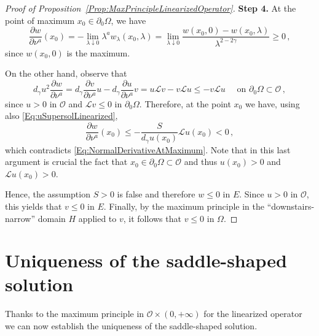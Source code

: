 \documentclass[12pt,reqno]{amsart}
\theoremstyle{definition}
\theoremstyle{remark}
\newcommand{\ocal}{\mathcal{O}}
\newcommand{\s}{\gamma}
\numberwithin{equation}{section}
\begin{document}
\begin{proof}[Proof of Proposition~\ref{Prop:MaxPrincipleLinearizedOperator}]
\textbf{Step 4.}
At the point of maximum $x_0 \in \partial_0 \Omega$, we have
\begin{equation}
\label{Eq:NormalDerivativeAtMaximum}
\dfrac{\partial w}{\partial \nu^a}(x_0) = -\lim_{\lambda \downarrow 0} \lambda^a w_\lambda (x_0,\lambda) = \lim_{\lambda \downarrow 0} \dfrac{w(x_0,0) - w(x_0, \lambda)}{\lambda^{2-2\s}} \geq 0\,,
\end{equation}
since $w(x_0,0)$ is the maximum.

On the other hand, observe that
$$
d_\s u^2 \dfrac{\partial w}{\partial \nu^a} = d_\s  \dfrac{\partial v}{\partial \nu^a} u  - d_\s  \dfrac{\partial u}{\partial \nu^a} v = u \mathscr{L}v  -  v \mathscr{L}u \leq -v \mathscr{L}u \quad \text{ on } \partial_0 \Omega \subset \ocal\,,
$$
since $u>0$ in $\ocal$ and $\mathscr{L}v \leq 0$ in $\partial_0 \Omega $. Therefore, at the point $x_0$ we have, using also \eqref{Eq:uSupersolLinearized}, 
$$
\dfrac{\partial w}{\partial \nu^a}(x_0) \leq -\dfrac{S}{d_\s u(x_0)} \mathscr{L}u(x_0) < 0\,,
$$
which contradicts \eqref{Eq:NormalDerivativeAtMaximum}. Note that in this last argument is crucial the fact that $x_0 \in \partial_0 \Omega \subset \ocal$ and thus $u(x_0)>0$ and $\mathscr{L}u (x_0) > 0$. 

Hence, the assumption $S>0$ is false and therefore $w \leq 0$ in $E$. Since $u > 0$ in $\ocal$, this yields that $v \leq 0$ in $E$. Finally, by the maximum principle in the ``downstairs-narrow'' domain $H$ applied to $v$, it follows that $v\leq 0$ in $\Omega$.
\end{proof}



\section{Uniqueness of the saddle-shaped solution}
\label{Sec:Uniqueness}
Thanks to the maximum principle in $\ocal\times (0,+\infty)$ for the linearized operator we can now establish the uniqueness of the saddle-shaped solution.
\end{document}

